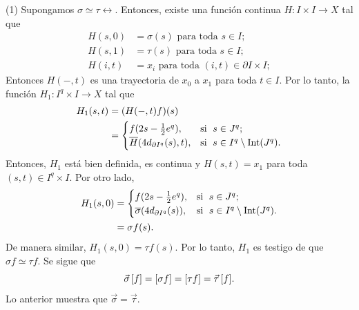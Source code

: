     \begin{dem}
    (1) Supongamos $\sigma\simeq \tau\rel$. Entonces, existe una función continua $H:I\times I\to X$ tal que 
    \begin{align*}
        H(s,0)&=\sigma(s) \text{ para toda } s\in I;\\
        H(s,1)&=\tau(s) \text{ para toda } s\in I;\\
        H(i,t)&=x_i \text{ para toda } (i,t)\in \partial I\times I;
    \end{align*}
    Entonces $H(-,t)$ es una trayectoria de $x_0$ a $x_1$ para toda $t\in I$. Por lo tanto, la función $H_1:I^q\times I\to X$ tal que 
    \begin{align*}
        H_1(s,t)&=(H(-,t)f)(s)\\
        &=\begin{cases}
         f(2s-\frac{1}{2}e^q), & \text{si \;} s\in J^q;\\
         \overline{H}(4d_{\partial I^q}(s),t), & \text{si \;} s\in I^q\setminus\mathrm{Int}(J^q).
        \end{cases}
    \end{align*}
    Entonces, $H_1$ está bien definida, es continua y $H(s,t)=x_1$ para toda $(s,t)\in I^q\times I$. Por otro lado,
    \begin{align*}
        H_1(s,0)&=\begin{cases}
         f(2s-\frac{1}{2}e^q), & \text{si \;} s\in J^q;\\
         \overline{\sigma}(4d_{\partial I^q}(s)), & \text{si \;} s\in I^q\setminus\mathrm{Int}(J^q).
         \end{cases}\\
         &=\sigma f(s).
    \end{align*}
    De manera similar, $H_1(s,0)=\tau f(s)$. Por lo tanto, $H_1$ es testigo de que $\sigma f\simeq \tau f$. Se sigue que
    \begin{equation*}
        \vec{\sigma}\hspace{0.5mm}[f]=[\sigma f]=[\tau f]=\vec{\tau}\hspace{0.6mm}[f].        
    \end{equation*}
    Lo anterior muestra que $\vec{\sigma}=\vec{\tau}.$


\end{dem}
